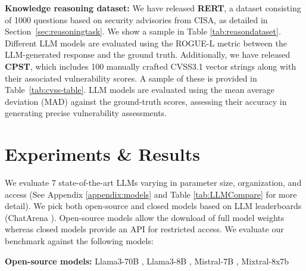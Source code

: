 \documentclass[conference]{IEEEtran}
\begin{document}
\begin{table}[]
\caption{Sample from CPST dataset}
\label{tab:cvss-table}

\centering
{}

\end{table}


\textbf{Knowledge reasoning dataset:} We have released \textbf{RERT}, a dataset consisting of 1000 questions based on security advisories from CISA, as detailed in Section~\ref{sec:reasoningtask}. We show a sample in Table \ref{tab:reasondataset}. Different LLM models are evaluated using the ROGUE-L metric \cite{lin-2004-rouge} between the LLM-generated response and the ground truth. Additionally, we have released \textbf{CPST}, which includes 100 manually crafted CVSS3.1 vector strings along with their associated vulnerability scores. A sample of these is provided in Table~\ref{tab:cvss-table}. LLM models are evaluated using the mean average deviation (MAD) against the ground-truth scores, assessing their accuracy in generating precise vulnerability assessments.



\section{Experiments \& Results}\label{sec:experiments}

We evaluate 7 state-of-the-art LLMs varying in parameter size, organization, and access (See Appendix \ref{appendix:models} and Table \ref{tab:LLMCompare} for more detail). We pick both open-source and closed models based on LLM leaderboards (ChatArena \cite{ChatArena}). Open-source models allow the download of full model weights whereas closed models provide an API for restricted access. We evaluate our benchmark against the following models:

\textbf{Open-source models:} Llama3-70B \cite{llama370b}, Llama3-8B \cite{llama38b}, Mistral-7B \cite{jiang2023mistral}, Mixtral-8x7b \cite{mixtral8x7b}
\end{document}

